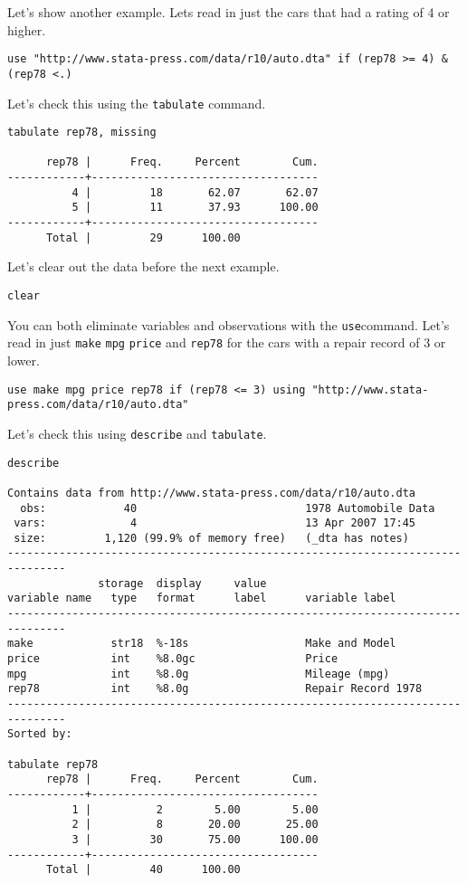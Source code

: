 Let's show another example. Lets read in just the cars that had a rating of 4 or higher.

\begin{lstlisting}
use "http://www.stata-press.com/data/r10/auto.dta" if (rep78 >= 4) & (rep78 <.)
\end{lstlisting}

Let's check this using the \lstinline{tabulate} command.

\begin{lstlisting}
tabulate rep78, missing

      rep78 |      Freq.     Percent        Cum.
------------+-----------------------------------
          4 |         18       62.07       62.07
          5 |         11       37.93      100.00
------------+-----------------------------------
      Total |         29      100.00
\end{lstlisting}

Let's clear out the data before the next example.

\begin{lstlisting}
clear
\end{lstlisting}

You can both eliminate variables and observations with the \lstinline{use}command. Let's read in just \lstinline{make} \lstinline{mpg} \lstinline{price} and \lstinline{rep78} for the cars with a repair record of 3 or lower.

\begin{lstlisting}
use make mpg price rep78 if (rep78 <= 3) using "http://www.stata-press.com/data/r10/auto.dta"
\end{lstlisting}

Let's check this using \lstinline{describe} and \lstinline{tabulate}.

\begin{lstlisting}
describe

Contains data from http://www.stata-press.com/data/r10/auto.dta
  obs:            40                          1978 Automobile Data
 vars:             4                          13 Apr 2007 17:45
 size:         1,120 (99.9% of memory free)   (_dta has notes)
-------------------------------------------------------------------------------
              storage  display     value
variable name   type   format      label      variable label
-------------------------------------------------------------------------------
make            str18  %-18s                  Make and Model
price           int    %8.0gc                 Price
mpg             int    %8.0g                  Mileage (mpg)
rep78           int    %8.0g                  Repair Record 1978
-------------------------------------------------------------------------------
Sorted by:

tabulate rep78
      rep78 |      Freq.     Percent        Cum.
------------+-----------------------------------
          1 |          2        5.00        5.00
          2 |          8       20.00       25.00
          3 |         30       75.00      100.00
------------+-----------------------------------
      Total |         40      100.00
\end{lstlisting}

